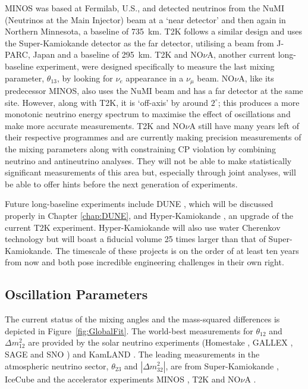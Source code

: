 MINOS was based at Fermilab, U.S., and detected neutrinos from the NuMI (Neutrinos at the Main Injector) beam at a `near detector' and then again in Northern Minnesota, a baseline of 735~km.  T2K follows a similar design and uses the Super-Kamiokande detector as the far detector, utilising a beam from J-PARC, Japan and a baseline of 295~km.  T2K and NO$\nu$A, another current long-baseline experiment, were designed specifically to measure the last mixing parameter, $\theta_{13}$, by looking for $\nu_e$ appearance in a $\nu_{\mu}$ beam.  NO$\nu$A, like its predecessor MINOS, also uses the NuMI beam and has a far detector at the same site.  However, along with T2K, it is `off-axis' by around $2^{\circ}$; this produces a more monotonic neutrino energy spectrum to maximise the effect of oscillations and make more accurate measurements.  T2K and NO$\nu$A still have many years left of their respective programmes and are currently making precision measurements of the mixing parameters along with constraining CP violation by combining neutrino and antineutrino analyses.  They will not be able to make statistically significant measurements of this area but, especially through joint analyses, will be able to offer hints before the next generation of experiments.

Future long-baseline experiments include DUNE \cite{DUNECDR1}, which will be discussed properly in Chapter \ref{chap:DUNE}, and Hyper-Kamiokande \cite{HyperKamiokande2015}, an upgrade of the current T2K experiment.  Hyper-Kamiokande will also use water Cherenkov technology but will boast a fiducial volume 25 times larger than that of Super-Kamiokande.  The timescale of these projects is on the order of at least ten years from now and both pose incredible engineering challenges in their own right.

\subsection{Oscillation Parameters}\label{sec:OscillationParameters}

The current status of the mixing angles and the mass-squared differences is depicted in Figure~\ref{fig:GlobalFit}.  The world-best measurements for $\theta_{12}$ and $\Delta m^2_{12}$ are provided by the solar neutrino experiments (Homestake \cite{Cleveland1995}, GALLEX \cite{Gallex2010}, SAGE \cite{Sage2009} and SNO \cite{SNO2013}) and KamLAND \cite{KamLAND2013}.  The leading measurements in the atmospheric neutrino sector, $\theta_{23}$ and $|\Delta m_{32}^2|$, are from Super-Kamiokande \cite{SuperKamiokande2010}, IceCube \cite{IceCube2015} and the accelerator experiments MINOS \cite{MINOS2013,MINOS2013b}, T2K \cite{T2Knumu2014} and NO$\nu$A \cite{NOvAnumu2016}.

